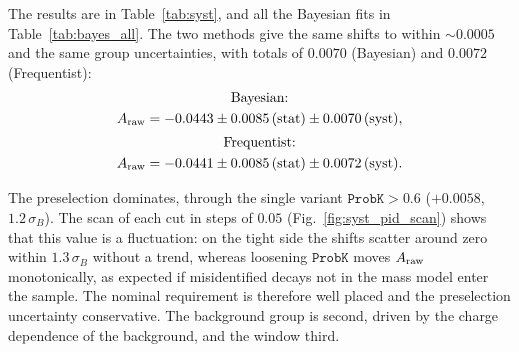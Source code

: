The results are in Table~\ref{tab:syst}, and all the Bayesian fits in Table~\ref{tab:bayes_all}. The two methods give the same shifts to within $\sim$$0.0005$ and the same group uncertainties, with totals of $0.0070$ (Bayesian) and $0.0072$ (Frequentist):
\begin{gather*}
\text{Bayesian:}\\ A_{\mathrm{raw}}=-0.0443\pm0.0085\,(\text{stat})\pm0.0070\,(\text{syst}),\\[2pt]
\text{Frequentist:}\\ A_{\mathrm{raw}}=-0.0441\pm0.0085\,(\text{stat})\pm0.0072\,(\text{syst}).
\end{gather*}

The preselection dominates, through the single variant $\texttt{ProbK}>0.6$ ($+0.0058$, $1.2\,\sigma_B$). The scan of each cut in steps of $0.05$ (Fig.~\ref{fig:syst_pid_scan}) shows that this value is a fluctuation: on the tight side the shifts scatter around zero within $1.3\,\sigma_B$ without a trend, whereas loosening $\texttt{ProbK}$ moves $A_{\mathrm{raw}}$ monotonically, as expected if misidentified decays not in the mass model enter the sample. The nominal requirement is therefore well placed and the preselection uncertainty conservative. The background group is second, driven by the charge dependence of the background, and the window third.

